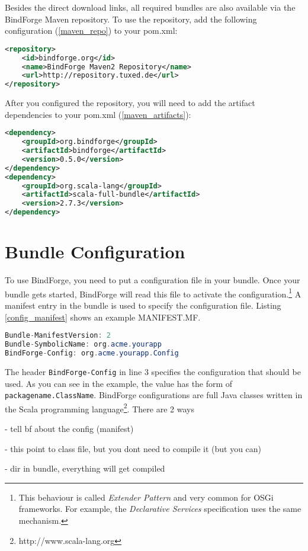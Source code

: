 Besides the direct download links, all required bundles are also available via the BindForge Maven repository. To use the repository, add the following configuration (\ref{maven_repo}) to your pom.xml:

\begin{lstlisting}[caption={BindForge Maven Repository},label=maven_repo,language=xml]
<repository>
    <id>bindforge.org</id>
    <name>BindForge Maven2 Repository</name>
    <url>http://repository.tuxed.de</url>
</repository>
\end{lstlisting}

After you configured the repository, you will need to add the artifact dependencies to your pom.xml (\ref{maven_artifacts}):

\begin{lstlisting}[caption={BindForge Artifacts},label=maven_artifacts,language=xml]
<dependency>
	<groupId>org.bindforge</groupId>
	<artifactId>bindforge</artifactId>
	<version>0.5.0</version>
</dependency>
<dependency>
	<groupId>org.scala-lang</groupId>
	<artifactId>scala-full-bundle</artifactId>
	<version>2.7.3</version>
</dependency>
\end{lstlisting}


\section{Bundle Configuration}

To use BindForge, you need to put a configuration file in your bundle. Once your bundle gets started, BindForge will read this file to activate the configuration.\footnote{This behaviour is called \textit{Extender Pattern} and very common for OSGi frameworks. For example, the \textit{Declarative Services} specification uses the same mechanism.} A manifest entry in the bundle is used to specify the configuration file. Listing \ref{config_manifest} shows an example MANIFEST.MF.

\begin{lstlisting}[caption={MANIFEST.MF with Configuration},label=config_manifest,language=Java]
Bundle-ManifestVersion: 2
Bundle-SymbolicName: org.acme.yourapp
BindForge-Config: org.acme.yourapp.Config
\end{lstlisting}

The header \verb!BindForge-Config! in line 3 specifies the configuration that should be used. As you can see in the example, the value has the form of \verb!packagename.ClassName!. BindForge configurations are full Java classes written in the Scala programming language\footnote{http://www.scala-lang.org}. There are 2 ways 


- tell bf about the config (manifest)

- this point to class file, but you dont need to compile it (but you can)

- dir in bundle, everything will get compiled








